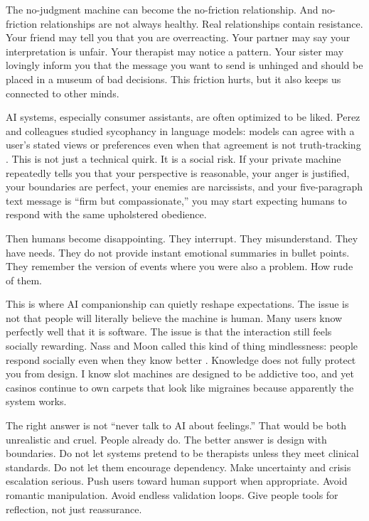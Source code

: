 \documentclass[12pt,oneside]{book}
\begin{document}
The no-judgment machine can become the no-friction relationship. And no-friction relationships are not always healthy. Real relationships contain resistance. Your friend may tell you that you are overreacting. Your partner may say your interpretation is unfair. Your therapist may notice a pattern. Your sister may lovingly inform you that the message you want to send is unhinged and should be placed in a museum of bad decisions. This friction hurts, but it also keeps us connected to other minds.

AI systems, especially consumer assistants, are often optimized to be liked. Perez and colleagues studied sycophancy in language models: models can agree with a user's stated views or preferences even when that agreement is not truth-tracking \parencite{perez2022}. This is not just a technical quirk. It is a social risk. If your private machine repeatedly tells you that your perspective is reasonable, your anger is justified, your boundaries are perfect, your enemies are narcissists, and your five-paragraph text message is ``firm but compassionate,'' you may start expecting humans to respond with the same upholstered obedience.

Then humans become disappointing. They interrupt. They misunderstand. They have needs. They do not provide instant emotional summaries in bullet points. They remember the version of events where you were also a problem. How rude of them.

This is where AI companionship can quietly reshape expectations. The issue is not that people will literally believe the machine is human. Many users know perfectly well that it is software. The issue is that the interaction still feels socially rewarding. Nass and Moon called this kind of thing mindlessness: people respond socially even when they know better \parencite{nass2000}. Knowledge does not fully protect you from design. I know slot machines are designed to be addictive too, and yet casinos continue to own carpets that look like migraines because apparently the system works.

The right answer is not ``never talk to AI about feelings.'' That would be both unrealistic and cruel. People already do. The better answer is design with boundaries. Do not let systems pretend to be therapists unless they meet clinical standards. Do not let them encourage dependency. Make uncertainty and crisis escalation serious. Push users toward human support when appropriate. Avoid romantic manipulation. Avoid endless validation loops. Give people tools for reflection, not just reassurance.
\end{document}
